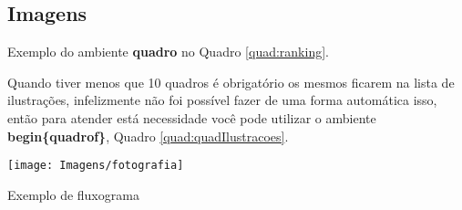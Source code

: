\lipsum[1-1]


\subsection{Imagens}
Exemplo do ambiente \textbf{quadro} no Quadro \ref{quad:ranking}.
\begin{quadro}[htb]
\end{quadro}

\newpage
Quando tiver menos que 10 quadros é obrigatório os mesmos ficarem na lista de ilustrações, infelizmente não foi possível fazer de uma forma automática isso, então para atender está necessidade você pode utilizar o ambiente \textbf{begin\{quadrof\}},  Quadro \ref{quad:quadIlustracoes}.


\begin{quadrof}[htb]
\end{quadrof}

\begin{grafico}[htb]
\end{grafico}

\begin{fotografia}[htb]
  {
  	\texttt{[image: Imagens/fotografia]}
 } {
 }
\end{fotografia}

\begin{fluxograma}[htb]
	\caption{Exemplo de fluxograma}
	\label{flux:grafico4}
\end{fluxograma}



